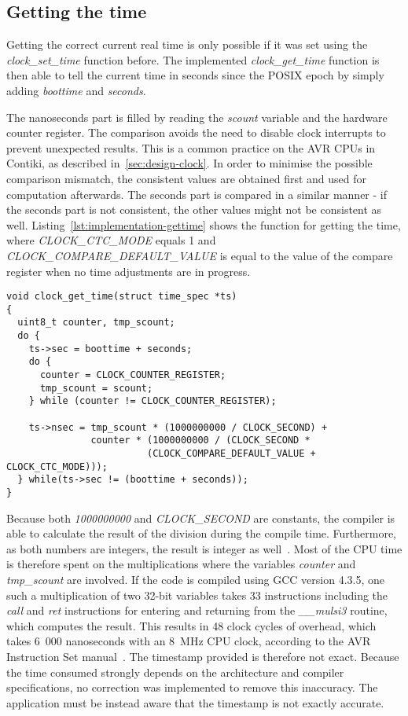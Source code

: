 \subsection{Getting the time}
Getting the correct current real time is only possible if it was set using
the {\it{clock\_set\_time}} function before.
The implemented {\it{clock\_get\_time}} function is then able to tell the
current time in seconds since the POSIX epoch by simply adding {\it{boottime}}
and {\it{seconds}}.

The nanoseconds part is filled by reading the {\it{scount}} variable and the hardware counter register.
The comparison avoids the need to disable clock interrupts to prevent unexpected results.
This is a common practice on the AVR CPUs in Contiki, as described in~\ref{sec:design-clock}.
In order to minimise the possible comparison mismatch,
the consistent values are obtained first and used for computation afterwards.
The seconds part is compared in a similar manner - if the seconds part is not consistent,
the other values might not be consistent as well.
Listing~\ref{lst:implementation-gettime} shows the function for getting the time,
where {\it{CLOCK\_CTC\_MODE}} equals 1 and {\it{CLOCK\_COMPARE\_DEFAULT\_VALUE}} is equal to
the value of the compare register when no time adjustments are in progress.
\begin{lstlisting}[caption={Function for getting the time},label={lst:implementation-gettime}]
void clock_get_time(struct time_spec *ts)
{
  uint8_t counter, tmp_scount;
  do {
    ts->sec = boottime + seconds;
    do {
      counter = CLOCK_COUNTER_REGISTER;
      tmp_scount = scount;
    } while (counter != CLOCK_COUNTER_REGISTER);

    ts->nsec = tmp_scount * (1000000000 / CLOCK_SECOND) +
               counter * (1000000000 / (CLOCK_SECOND *
                         (CLOCK_COMPARE_DEFAULT_VALUE + CLOCK_CTC_MODE)));
  } while(ts->sec != (boottime + seconds));
}
\end{lstlisting}
Because both {\it{1000000000}} and {\it{CLOCK\_SECOND}} are constants, the compiler is able to
calculate the result of the division during the compile time.
Furthermore, as both numbers are integers, the result is integer as well~\cite{c99}.
Most of the CPU time is therefore spent on the multiplications where the variables
{\it{counter}} and {\it{tmp\_scount}} are involved.
If the code is compiled using GCC version 4.3.5,
one such a multiplication of two 32-bit variables takes 33 instructions including the {\it{call}} and {\it{ret}}
instructions for entering and returning from the {\it{\_\_mulsi3}} routine, which computes the result.
This results in 48 clock cycles of overhead,
which takes 6~000 nanoseconds with an 8~MHz CPU clock,
according to the AVR Instruction Set manual~\cite{avr-instruction-set}.
The timestamp provided is therefore not exact.
Because the time consumed strongly depends on the architecture and compiler specifications,
no correction was implemented to remove this inaccuracy.
The application must be instead aware that the timestamp is not exactly accurate.


